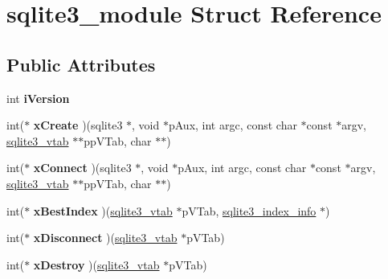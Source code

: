 \hypertarget{structsqlite3__module}{}\section{sqlite3\+\_\+module Struct Reference}
\label{structsqlite3__module}
\subsection*{Public Attributes}
\begin{DoxyCompactItemize}
\item 
\mbox{\label{structsqlite3__module_a42b11d080dc205aea43581b18f925afe}} 
int {\bfseries i\+Version}
\item 
\mbox{\label{structsqlite3__module_a95e327c9d32abd731013395d9e12b8f9}} 
int($\ast$ {\bfseries x\+Create} )(sqlite3 $\ast$, void $\ast$p\+Aux, int argc, const char $\ast$const $\ast$argv, \hyperlink{structsqlite3__vtab}{sqlite3\+\_\+vtab} $\ast$$\ast$pp\+V\+Tab, char $\ast$$\ast$)
\item 
\mbox{\label{structsqlite3__module_acdd9ccc4a6acff230b2d579172ae32d0}} 
int($\ast$ {\bfseries x\+Connect} )(sqlite3 $\ast$, void $\ast$p\+Aux, int argc, const char $\ast$const $\ast$argv, \hyperlink{structsqlite3__vtab}{sqlite3\+\_\+vtab} $\ast$$\ast$pp\+V\+Tab, char $\ast$$\ast$)
\item 
\mbox{\label{structsqlite3__module_a66577e230ca8de525b30ee6f287eafb1}} 
int($\ast$ {\bfseries x\+Best\+Index} )(\hyperlink{structsqlite3__vtab}{sqlite3\+\_\+vtab} $\ast$p\+V\+Tab, \hyperlink{structsqlite3__index__info}{sqlite3\+\_\+index\+\_\+info} $\ast$)
\item 
\mbox{\label{structsqlite3__module_a5dbaa6ff075eaff25ccfddaedba06934}} 
int($\ast$ {\bfseries x\+Disconnect} )(\hyperlink{structsqlite3__vtab}{sqlite3\+\_\+vtab} $\ast$p\+V\+Tab)
\item 
\mbox{\label{structsqlite3__module_a296dae8dadd4eb1f7d0f1187650c7aa5}} 
int($\ast$ {\bfseries x\+Destroy} )(\hyperlink{structsqlite3__vtab}{sqlite3\+\_\+vtab} $\ast$p\+V\+Tab)
\item 
\mbox{\label{structsqlite3__module_a2cb9f8c149617189efa6ceec0a3211e9}} 

\end{DoxyCompactItemize}
